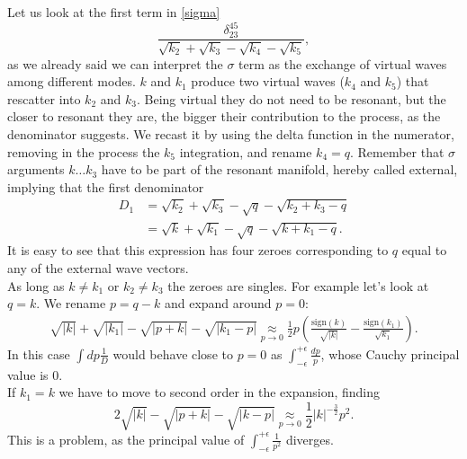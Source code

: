     Let us look at the first term in \eqref{sigma}
    \begin{equation}
        \frac{\delta_{23}^{45}}{\sqrt{k_2}+\sqrt{k_3}-\sqrt{k_4}-\sqrt{k_5}},
    \end{equation} 
    as we already said we can interpret the $\sigma$ term as the exchange of virtual waves among different modes.
    $k$ and $k_1$ produce two virtual waves ($k_4$ and $k_5$) that rescatter into $k_2$ and $k_3$.
    Being virtual they do not need to be resonant, but the closer to resonant they are, the bigger their contribution to the process, as the denominator suggests.   
    We recast it by using the delta function in the numerator, removing in the process the $k_5$ integration, and rename $k_4=q$. Remember that $\sigma$ arguments $k\dots k_3$ have to be part of the resonant manifold, hereby called external, implying  that the first denominator
    \begin{equation}
        \begin{aligned}
      D_1 &= \sqrt{k_2} + \sqrt{k_3} -\sqrt{q} - \sqrt{k_2 + k_3 - q}\\
       &= \sqrt{k} + \sqrt{k_1} -\sqrt{q} - \sqrt{k + k_1 - q}.
        \end{aligned}
    \end{equation}
    It is easy to see that this expression has four zeroes corresponding to $q$ equal to any of the external wave vectors. \\
    As long as $k \neq k_1$ or $k_2 \neq k_3$ the zeroes are singles. For example let's look at $q = k$. We rename $p = q-k$ and expand around $p=0$:
    \begin{align*}
      \sqrt{|k|} + \sqrt{|k_1|} -\sqrt{|p+k|} - \sqrt{|k_1 - p|} \underset{p \rightarrow 0}{\approx} \frac{1}{2} p \left(\frac{\text{sign}(k)}{\sqrt{|k|}} - \frac{\text{sign}(k_1)}{\sqrt{k_1}}\right).
    \end{align*}
    In this case $\int dp\frac{1}{D}$ would behave close to $p=0$ as $\int_{-\epsilon}^{+\epsilon}\frac{dp}{p}$, whose Cauchy principal value is 0. \\
    If $k_1 = k$ we have to move to second order in the expansion, finding 
    \begin{equation}
      2\sqrt{|k|} -\sqrt{|p+k|} - \sqrt{|k - p|} \underset{p \rightarrow 0}{\approx} \frac{1}{2}|k|^{-\frac{3}{2}} p^2.
    \end{equation}
    This is a problem, as the principal value of $\int_{-\epsilon}^{+\epsilon}\frac{1}{p^2}$ diverges.\\
